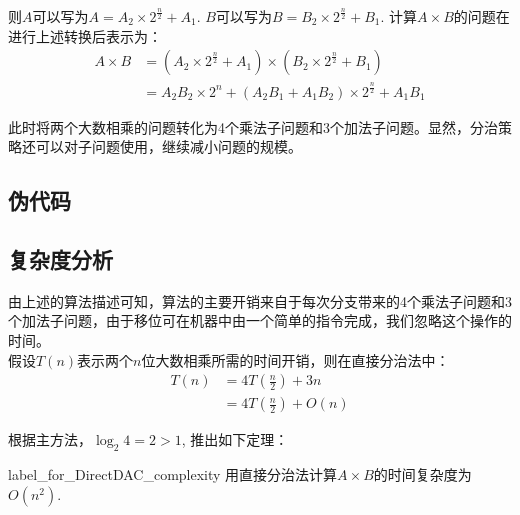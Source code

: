 则$A$可以写为$A = A_2 \times 2^{\frac{n}{2}} + A_1$.
$B$可以写为$B = B_2 \times 2^{\frac{n}{2}} + B_1$.
计算$A \times B$的问题在进行上述转换后表示为：
\begin{displaymath}
	\begin{split}
		A \times B
		& = (A_2 \times 2^{\frac{n}{2}} + A_1) \times (B_2 \times 2^{\frac{n}{2}} + B_1) \\
		& = A_2 B_2 \times 2^n + (A_2 B_1 + A_1 B_2) \times 2^{\frac{n}{2}} + A_1 B_1
	\end{split}
\end{displaymath}

此时将两个大数相乘的问题转化为4个乘法子问题和3个加法子问题。显然，分治策略还可以对子问题使用，继续减小问题的规模。

\subsection{伪代码}
\begin{algorithm}
	\DontPrintSemicolon{}
	\caption{DirectDAC\label{label_for_pseudo_DirectDAC}}
\end{algorithm}

\subsection{复杂度分析}
由上述的算法描述可知，算法的主要开销来自于每次分支带来的4个乘法子问题和3个加法子问题，由于移位可在机器中由一个简单的指令完成，我们忽略这个操作的时间。\\
假设$T(n)$表示两个$n$位大数相乘所需的时间开销，则在直接分治法中：
\begin{displaymath}
	\begin{split}
		T(n)
		&= 4T(\frac{n}{2}) + 3n \\
		&= 4T(\frac{n}{2}) + O(n)
	\end{split}
\end{displaymath}

根据主方法，$\log_2 4  = 2> 1$, 推出如下定理：
\begin{theorem}{}{label_for_DirectDAC_complexity}
	用直接分治法计算$A \times B$的时间复杂度为$O(n^2)$.
\end{theorem}

